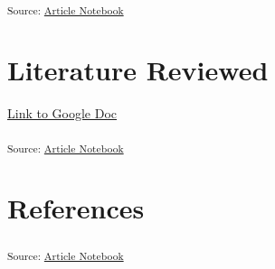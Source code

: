 \documentclass[
]{agujournal2019}
\begin{document}
\textsubscript{Source:
\href{https://Ryan3Lima.github.io/ATUR-KARST/index.ipynb.html}{Article
Notebook}}

\section{Literature Reviewed}\label{literature-reviewed}

\href{https://docs.google.com/spreadsheets/d/1DqNXqxHH6nxKWdOpNTpD1daRn8tsU53mV59tp-z9eVA/edit?usp=sharing}{Link
to Google Doc}

\textsubscript{Source:
\href{https://Ryan3Lima.github.io/ATUR-KARST/index.ipynb.html}{Article
Notebook}}

\section*{References}\label{references}

\vspace{1em}

\textsubscript{Source:
\href{https://Ryan3Lima.github.io/ATUR-KARST/index.ipynb.html}{Article
Notebook}}
\end{document}
